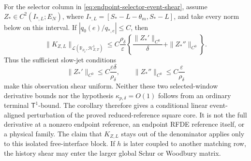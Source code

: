\begin{corollary}
For the selector column in
\cref{eq:endpoint-selector-event-shear}, assume
\(
 Z_*\in C^2(I_{*,L};E_N)
\), where
\(
 I_{*,L}=[S_*-L-\theta_m,S_*-L]
\), and take every norm below on this interval.  If
\(
 |q_0(e)/q_{*,e}|\le C
\), then
\begin{equation}
 \|K_{Z,L}\|_{\mathcal L(\mathbb R_{\rho_\delta},
                \mathcal H_{Z,T}^1)}
 \le C\frac{\rho_\delta}{\varepsilon}
   \left\{\frac{\|Z_*'\|_{C^0}}{\delta}
                  +\|Z_*''\|_{C^0}\right\}.      \label{eq:terminal-history-shear-jet-bound}
\end{equation}
Thus the sufficient slow-jet conditions
\begin{equation}
 \|Z_*'\|_{C^0}\le C\frac{\varepsilon\delta}{\rho_\delta},
 \qquad
 \|Z_*''\|_{C^0}\le C\frac{\varepsilon}{\rho_\delta}         \label{eq:terminal-history-slow-jet-gate}
\end{equation}
make this observation shear uniform.  Neither these two selected-window
derivative bounds nor
the hypothesis \(\kappa_{p,\delta}=O(1)\) follows from an ordinary terminal
\(\mathsf T^1\)-bound.  The corollary therefore gives a conditional linear
event-aligned perturbation of the proved reduced-reference square core.  It
is not the full derivative at a nonzero endpoint reference, an endpoint RFDE
reference itself, or a physical family.  The claim that \(K_{Z,L}\) stays out
of the denominator applies only to this isolated free-interface block.  If
\(h\) is later coupled to another matching row, the history shear may enter
the larger global Schur or Woodbury matrix.
\end{corollary}

